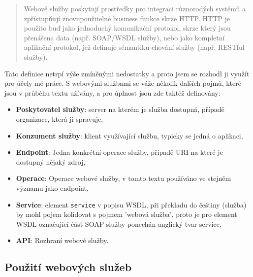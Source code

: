 \documentclass[czech,DP]{thesiskiv}
\begin{document}
\begin{quote}
	Webové služby poskytují prostředky pro integraci různorodých systémů a zpřístupňují znovupoužitelné business funkce skrze HTTP. HTTP je použito buď jako jednoduchý komunikační protokol, skrze který jsou přenášena data (např. SOAP/WSDL služby), nebo jako kompletní aplikační protokol, jež definuje sémantiku chování služby (např. RESTful služby).
\end{quote}

Tato definice netrpí výše zmíněnými nedostatky a proto jsem se rozhodl ji využít pro účely mé práce. S webovými službami se váže několik dalších pojmů, které jsou v průběhu textu užívány, a pro úplnost jsou zde taktéž definovány:


\begin{itemize}
	\item \textbf{Poskytovatel služby}: server na kterém je služba dostupná, případě organizace, která ji spravuje,
	\item \textbf{Konzument služby}: klient využívající službu, typicky se jedná o aplikaci,
	\item \textbf{Endpoint}: Jedna konkrétní operace služby, případě URI na které je dostupný nějaký zdroj,
	\item \textbf{Operace}: Operace webové služby, v tomto textu používáno ve stejném významu jako endpoint,
	\item \textbf{Service}: element \verb|service| v popisu WSDL, při překladu do češtiny (služba) by mohl pojem kolidovat s pojmem 'webová služba', proto je pro element WSDL označující část SOAP služby ponechán anglický tvar service,
	\item \textbf{API}: Rozhraní webové služby.
\end{itemize}

\subsection{Použití webových služeb}
\end{document}
